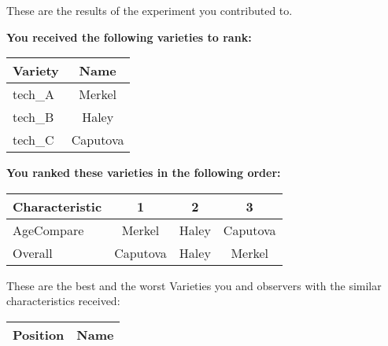 \documentclass[10pt]{article}
\begin{document}
\begin{titlepage}
	These are the results of the experiment you contributed to.

	\begin{flushleft}
		\textbf{You received the following varieties to rank: }\hfill \break
		\begin{tabularx}{\textwidth}{ X | c  }
			\hline
			\textbf{Variety} & \textbf{Name} \\ \hline

			
				tech\_A & Merkel \\ \hline
			
				tech\_B & Haley \\ \hline
			
				tech\_C & Caputova \\ \hline
			


		\end{tabularx}\newline \newline

		\textbf{You ranked these varieties in the following order: }\hfill \break
		\begin{tabularx}{\textwidth}{ X | c | c | c  }
			\hline
			\textbf{Characteristic}
			
				& \textbf{ 1 }
			
				& \textbf{ 2 }
			
				& \textbf{ 3 }
			
			\\ \hline


			
				AgeCompare & Merkel  & Haley  & Caputova  \\ \hline


			
				Overall & Caputova  & Haley  & Merkel  \\ \hline


			

		\end{tabularx}

	\end{flushleft}

	\pagebreak

	\begin{flushleft}
		These are the best and the worst Varieties you and observers with the similar characteristics received:\hfill \break \newline
		\begin{tabularx}{\textwidth}{ X | X  }
			\hline
			\textbf{Position} & \textbf{Name} \\ \hline


\end{tabularx}
\end{flushleft}
\end{titlepage}
\end{document}
